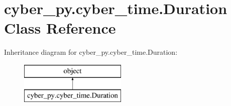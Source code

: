 \hypertarget{classcyber__py_1_1cyber__time_1_1Duration}{\section{cyber\-\_\-py.\-cyber\-\_\-time.\-Duration Class Reference}
\label{classcyber__py_1_1cyber__time_1_1Duration}
}
Inheritance diagram for cyber\-\_\-py.\-cyber\-\_\-time.\-Duration\-:\begin{figure}[H]
\begin{center}
\leavevmode
\includegraphics[height=2.000000cm]{classcyber__py_1_1cyber__time_1_1Duration}
\end{center}
\end{figure}
